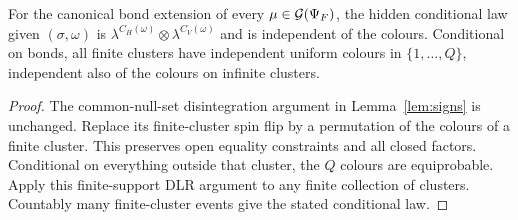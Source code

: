 \begin{lemma}\label{lem:potts-colours}
For the canonical bond extension of every $\mu\in\mathcal G(\Psi_F)$, the hidden conditional law given $(\sigma,\omega)$ is
$\lambda^{C_H(\omega)}\otimes\lambda^{C_V(\omega)}$ and is independent of the colours. Conditional on bonds, all finite clusters have independent uniform colours in $\{1,\ldots,Q\}$, independent also of the colours on infinite clusters.
\end{lemma}
\begin{proof}
The common-null-set disintegration argument in Lemma~\ref{lem:signs} is unchanged. Replace its finite-cluster spin flip by a permutation of the colours of a finite cluster. This preserves open equality constraints and all closed factors. Conditional on everything outside that cluster, the $Q$ colours are equiprobable. Apply this finite-support DLR argument to any finite collection of clusters. Countably many finite-cluster events give the stated conditional law.
\end{proof}

